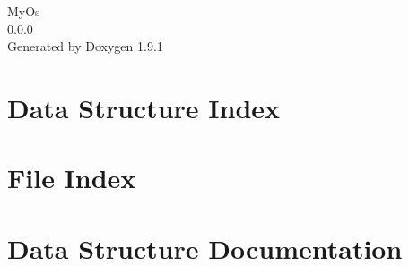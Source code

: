 \let\mypdfximage\pdfximage\def\pdfximage{\immediate\mypdfximage}\documentclass[twoside]{book}
\newcommand{\+}{\discretionary{\mbox{\scriptsize$\hookleftarrow$}}{}{}}
\newcommand{\clearemptydoublepage}{%
  \newpage{\pagestyle{empty}\cleardoublepage}%
}
\begin{document}
\raggedbottom

\hypersetup{pageanchor=false,
             bookmarksnumbered=true,
             pdfencoding=unicode
            }
\begin{titlepage}
\vspace*{7cm}
\begin{center}%
{\Large My\+Os \\[1ex]\large 0.\+0.\+0 }\\
\vspace*{1cm}
{\large Generated by Doxygen 1.9.1}\\
\end{center}
\end{titlepage}
\clearemptydoublepage
{}
\tableofcontents
\clearemptydoublepage
{}
\hypersetup{pageanchor=true}

\chapter{Data Structure Index}

\chapter{File Index}

\chapter{Data Structure Documentation}

















\end{document}
